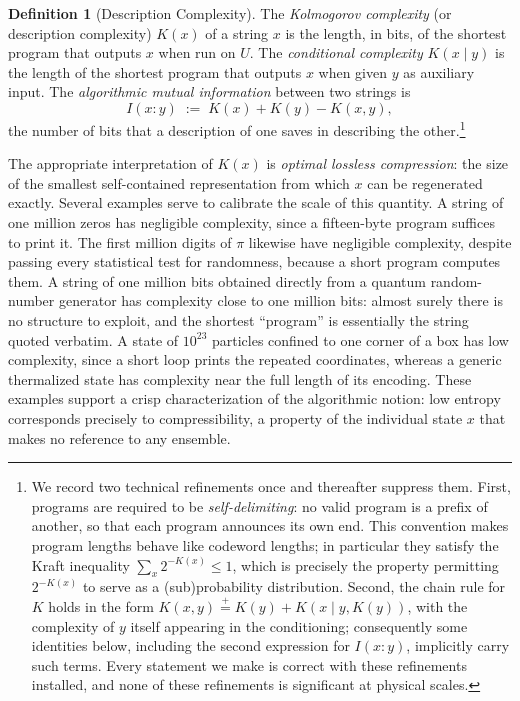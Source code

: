 \documentclass[10pt]{article}
\theoremstyle{definition}
\newtheorem{definition}[theorem]{Definition}
\theoremstyle{remark}
\newcommand{\peq}{\mathrel{\stackrel{+}{=}}}
\begin{document}
\begin{definition}[Description Complexity]
\label{def:K}
The \emph{Kolmogorov complexity} (or description complexity) $K(x)$ of a string $x$ is the length, in bits, of the shortest program that outputs $x$ when run on $U$. The \emph{conditional complexity} $K(x \mid y)$ is the length of the shortest program that outputs $x$ when given $y$ as auxiliary input. The \emph{algorithmic mutual information} between two strings is
\[
I(x : y) \;:=\; K(x) + K(y) - K(x, y),
\]
the number of bits that a description of one saves in describing the other.\footnote{We record two technical refinements once and thereafter suppress them. First, programs are required to be \emph{self-delimiting}: no valid program is a prefix of another, so that each program announces its own end. This convention makes program lengths behave like codeword lengths; in particular they satisfy the Kraft inequality $\sum_x 2^{-K(x)} \le 1$, which is precisely the property permitting $2^{-K(x)}$ to serve as a (sub)probability distribution. Second, the chain rule for $K$ holds in the form $K(x,y) \peq K(y) + K(x \mid y, K(y))$, with the complexity of $y$ itself appearing in the conditioning; consequently some identities below, including the second expression for $I(x:y)$, implicitly carry such terms. Every statement we make is correct with these refinements installed, and none of these refinements is significant at physical scales.}
\end{definition}

The appropriate interpretation of $K(x)$ is \emph{optimal lossless compression}: the size of the smallest self-contained representation from which $x$ can be regenerated exactly. Several examples serve to calibrate the scale of this quantity. A string of one million zeros has negligible complexity, since a fifteen-byte program suffices to print it. The first million digits of $\pi$ likewise have negligible complexity, despite passing every statistical test for randomness, because a short program computes them. A string of one million bits obtained directly from a quantum random-number generator has complexity close to one million bits: almost surely there is no structure to exploit, and the shortest ``program'' is essentially the string quoted verbatim. A state of $10^{23}$ particles confined to one corner of a box has low complexity, since a short loop prints the repeated coordinates, whereas a generic thermalized state has complexity near the full length of its encoding. These examples support a crisp characterization of the algorithmic notion: low entropy corresponds precisely to compressibility, a property of the individual state $x$ that makes no reference to any ensemble.
\end{document}
